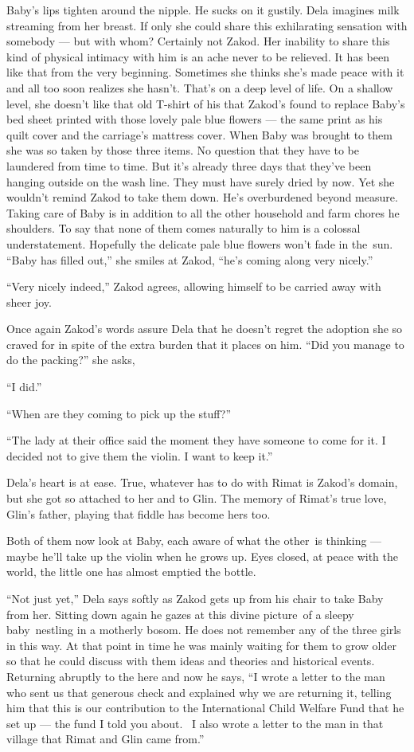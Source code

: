 \documentclass[twoside,11pt,openany]{book}
\begin{document}
Baby's lips tighten around the nipple. He sucks on it gustily. Dela imagines milk streaming from her breast.  If only
she could share this exhilarating sensation with somebody --- but with whom? Certainly not Zakod. Her inability to share
this kind of physical intimacy with him is an ache never to be relieved. It has been like that from the very
beginning. Sometimes she thinks she's made peace with it and all too soon realizes she hasn't. That's on a deep level
of life. On a shallow level, she doesn't like that old T-shirt of his that Zakod's found to replace Baby's bed
sheet printed with those lovely pale blue flowers --- the same print as his quilt cover and the carriage's mattress
cover. When Baby was brought to them she was so taken by those three items. No question that they have to be laundered
from time to time. But it's already three days that they've been hanging outside on the wash line. They must have
surely dried by now. Yet she wouldn't remind Zakod to take them down. He's overburdened beyond measure. Taking care
of Baby is in addition to all the other household and farm chores he shoulders. To say that none of them comes naturally to
him is a colossal understatement. Hopefully the delicate pale blue flowers won't fade in the~sun. ``Baby
has filled out,'' she smiles at Zakod, ``he's coming along very nicely.''

``Very nicely indeed,'' Zakod agrees, allowing himself to be carried away with sheer joy.

Once again Zakod's words assure Dela that he doesn't regret the adoption she so craved for in spite of the extra burden
that it places on him. ``Did you manage to do the packing?'' she asks,

``I did.''

``When are they coming to pick up the stuff?''

``The lady at their office said the moment they have someone to come for it. I decided not to give them the
violin. I want to keep it.''

Dela's heart is at ease. True, whatever has to do with Rimat is Zakod's domain, but she got so attached to her and to
Glin. The memory of Rimat's true love, Glin's father, playing that fiddle has become hers too.

Both of them now look at Baby, each aware of what the other~is thinking --- maybe he'll take up the violin when he grows
up. Eyes closed, at peace with the world, the little one has almost emptied the bottle.

``Not just yet,'' Dela says softly as Zakod gets up from his chair to take Baby from her.
Sitting down again he gazes at this divine picture~of a sleepy baby~nestling in a motherly bosom. He does not remember
any of the three girls in this way. At that point in time he was mainly waiting for them to grow older so that he
could discuss with them ideas and theories and historical events. Returning abruptly to the here and now he says,
``I wrote a letter to the man who sent us that generous check and explained why we are returning it,
telling him that this is our contribution to the International Child Welfare Fund that he set up --- the fund I told you
about. ~I also wrote a letter to the man in that village that Rimat and Glin came from.''
\end{document}
